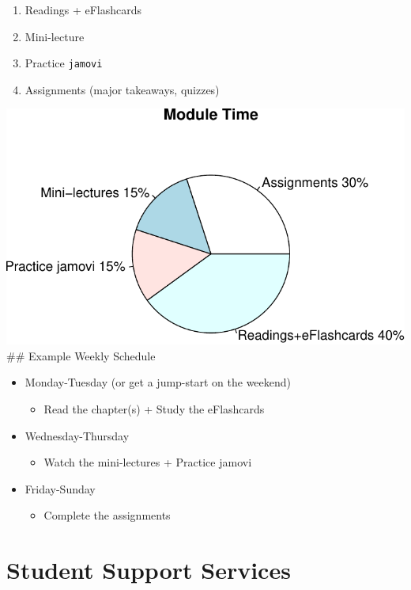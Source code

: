\documentclass[11pt,]{article}
\makeatletter
\providecommand{\tightlist}{%
  \setlength{\itemsep}{0pt}\setlength{\parskip}{0pt}}
\def\maxwidth{\ifdim\Gin@nat@width>\linewidth\linewidth
\else\Gin@nat@width\fi}
\let\Oldincludegraphics\includegraphics
\renewcommand{\includegraphics}[1]{\Oldincludegraphics[width=\maxwidth]{#1}}
\makeatother
\begin{document}
\begin{enumerate}
\def\labelenumi{\arabic{enumi}.}
\tightlist
\item
  Readings + eFlashcards
\item
  Mini-lecture
\item
  Practice \texttt{jamovi}
\item
  Assignments (major takeaways, quizzes)
\end{enumerate}

\includegraphics{KIN610-SP22_files/figure-latex/unnamed-chunk-1-1.pdf}
\#\# Example Weekly Schedule

\begin{itemize}
\tightlist
\item
  Monday-Tuesday (or get a jump-start on the weekend)

  \begin{itemize}
  \tightlist
  \item
    Read the chapter(s) + Study the eFlashcards
  \end{itemize}
\item
  Wednesday-Thursday

  \begin{itemize}
  \tightlist
  \item
    Watch the mini-lectures + Practice jamovi
  \end{itemize}
\item
  Friday-Sunday

  \begin{itemize}
  \tightlist
  \item
    Complete the assignments
  \end{itemize}
\end{itemize}

\hypertarget{student-support-services}{%
\section{Student Support Services}\label{student-support-services}}
\end{document}
